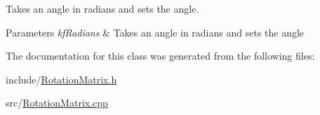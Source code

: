 Takes an angle in radians and sets the angle. 


\begin{DoxyParams}{Parameters}
{\em kf\+Radians} & Takes an angle in radians and sets the angle \\
\hline
\end{DoxyParams}


The documentation for this class was generated from the following files\+:\begin{DoxyCompactItemize}
\item 
include/\hyperlink{_rotation_matrix_8h}{Rotation\+Matrix.\+h}\item 
src/\hyperlink{_rotation_matrix_8cpp}{Rotation\+Matrix.\+cpp}\end{DoxyCompactItemize}
